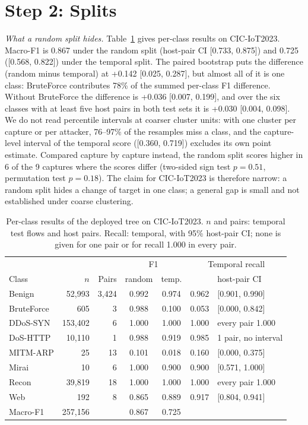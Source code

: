 \section{Step 2: Splits}\label{sec:splits}

\emph{What a random split hides.} Table~\ref{tab:perclass} gives per-class results on CIC-IoT2023. Macro-F1 is 0.867 under the random split (host-pair CI [0.733, 0.875]) and 0.725 ([0.568, 0.822]) under the temporal split. The paired bootstrap puts the difference (random minus temporal) at +0.142 [0.025, 0.287], but almost all of it is one class: BruteForce contributes 78\% of the summed per-class F1 difference. Without BruteForce the difference is +0.036 [0.007, 0.199], and over the six classes with at least five host pairs in both test sets it is +0.030 [0.004, 0.098]. We do not read percentile intervals at coarser cluster units: with one cluster per capture or per attacker, 76--97\% of the resamples miss a class, and the capture-level interval of the temporal score ([0.360, 0.719]) excludes its own point estimate. Compared capture by capture instead, the random split scores higher in 6 of the 9 captures where the scores differ (two-sided sign test $p=0.51$, permutation test $p=0.18$). The claim for CIC-IoT2023 is therefore narrow: a random split hides a change of target in one class; a general gap is small and not established under coarse clustering.

\begin{table}[t]
\centering
\caption{Per-class results of the deployed tree on CIC-IoT2023. $n$ and pairs: temporal test flows and host pairs. Recall: temporal, with 95\% host-pair CI; none is given for one pair or for recall 1.000 in every pair.}
\label{tab:perclass}
\footnotesize
\setlength{\tabcolsep}{3pt}
\begin{tabular}{lrrcccl}
\hline
 & & & \multicolumn{2}{c}{F1} & \multicolumn{2}{c}{Temporal recall} \\
Class & $n$ & Pairs & random & temp. & & host-pair CI \\
\hline
Benign     &  52,993 & 3,424 & 0.992 & 0.974 & 0.962 & [0.901, 0.990] \\
BruteForce &     605 &     3 & 0.988 & 0.100 & 0.053 & [0.000, 0.842] \\
DDoS-SYN   & 153,402 &     6 & 1.000 & 1.000 & 1.000 & every pair 1.000 \\
DoS-HTTP   &  10,110 &     1 & 0.988 & 0.919 & 0.985 & 1 pair, no interval \\
MITM-ARP   &      25 &    13 & 0.101 & 0.018 & 0.160 & [0.000, 0.375] \\
Mirai      &      10 &     6 & 1.000 & 0.900 & 0.900 & [0.571, 1.000] \\
Recon      &  39,819 &    18 & 1.000 & 1.000 & 1.000 & every pair 1.000 \\
Web        &     192 &     8 & 0.865 & 0.889 & 0.917 & [0.804, 0.941] \\
\hline
Macro-F1   & 257,156 &       & 0.867 & 0.725 & & \\
\hline
\end{tabular}
\end{table}

